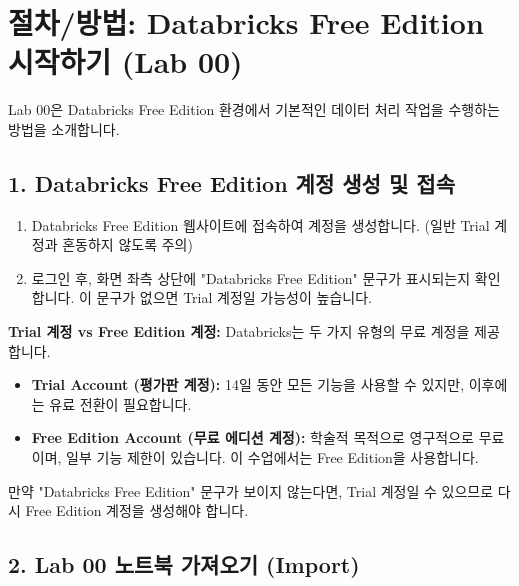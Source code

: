 \documentclass[11pt,a4paper]{article}
\theoremstyle{definition}
\begin{document}
\newpage

\section*{절차/방법: Databricks Free Edition 시작하기 (Lab 00)}

Lab 00은 Databricks Free Edition 환경에서 기본적인 데이터 처리 작업을 수행하는 방법을 소개합니다.

\subsection*{1. Databricks Free Edition 계정 생성 및 접속}

\begin{enumerate}
    \item Databricks Free Edition 웹사이트에 접속하여 계정을 생성합니다. (일반 Trial 계정과 혼동하지 않도록 주의)
    \item 로그인 후, 화면 좌측 상단에 "Databricks Free Edition" 문구가 표시되는지 확인합니다. 이 문구가 없으면 Trial 계정일 가능성이 높습니다.
\end{enumerate}

\begin{warningbox}
\textbf{Trial 계정 vs Free Edition 계정:}
Databricks는 두 가지 유형의 무료 계정을 제공합니다.
\begin{itemize}
    \item \textbf{Trial Account (평가판 계정):} 14일 동안 모든 기능을 사용할 수 있지만, 이후에는 유료 전환이 필요합니다.
    \item \textbf{Free Edition Account (무료 에디션 계정):} 학술적 목적으로 영구적으로 무료이며, 일부 기능 제한이 있습니다. 이 수업에서는 Free Edition을 사용합니다.
\end{itemize}
만약 "Databricks Free Edition" 문구가 보이지 않는다면, Trial 계정일 수 있으므로 다시 Free Edition 계정을 생성해야 합니다.
\end{warningbox}

\subsection*{2. Lab 00 노트북 가져오기 (Import)}
\end{document}
